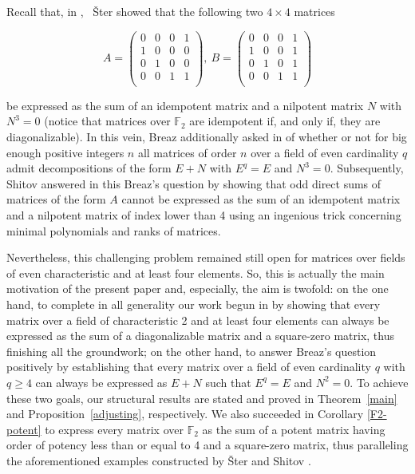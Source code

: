 \documentclass{amsart}
\def\FF{\mathbb{F}}
\theoremstyle{definition}
\theoremstyle{remark}
\numberwithin{equation}{section}
\begin{document}
\medskip

Recall that, in \cite{St1}, ~\v{S}ter showed that the following two $4\times 4$ matrices

\medskip

$$
A=\left(
    \begin{array}{cccc}
      0 & 0 & 0 & 1 \\
      1 & 0 & 0 & 0 \\
      0 & 1 & 0 & 0 \\
      0 & 0 & 1 & 1 \\
    \end{array}
  \right),~ B=\left(
    \begin{array}{cccc}
      0 & 0 & 0 & 1 \\
      1 & 0 & 0 & 1 \\
      0 &1 & 0 &1 \\
      0 & 0 &1 & 1 \\
    \end{array}
  \right)
$$

\medskip

 be expressed as the sum of an idempotent matrix and a nilpotent matrix $N$ with $N^3=0$ (notice that matrices over $\mathbb{F}_2$ are idempotent if, and only if, they are diagonalizable).
In this vein, Breaz additionally asked in \cite{Br} of whether or not for big enough positive integers $n$ all matrices of order $n$ over a field of even cardinality $q$ admit decompositions of the form $E+N$ with $E^q=E$ and $N^3=0$. Subsequently, Shitov answered in \cite{Sh} this Breaz's question by showing that odd direct sums of matrices of the form $A$ cannot be expressed as the sum of an idempotent matrix and a nilpotent matrix of index lower than 4 using an ingenious trick concerning minimal polynomials and ranks of matrices.

\medskip

Nevertheless, this challenging problem remained still open for matrices over fields of even characteristic and at least four elements. So, this is actually the main motivation of the present paper and, especially, the aim is twofold: on the one hand, to complete in all generality our work begun in \cite{DGL1} by showing that every matrix over a field of characteristic 2 and at least four elements can always be expressed as the sum of a diagonalizable matrix and a square-zero matrix, thus finishing all the groundwork;  on the other hand, to answer Breaz's question positively by establishing that every matrix over a field of even cardinality $q$ with $q\ge 4$ can always be expressed as $E+N$ such that $E^q=E$ and $N^2=0$. To achieve these two goals, our structural results are stated and proved in Theorem~\ref{main} and Proposition~\ref{adjusting}, respectively. We also succeeded in Corollary \ref{F2-potent} to express every matrix over $\FF_2$ as the sum of a potent matrix having order of potency less than or equal to 4 and a square-zero matrix, thus paralleling the aforementioned examples constructed by \v{S}ter \cite{St1} and Shitov \cite{Sh}.
\end{document}
